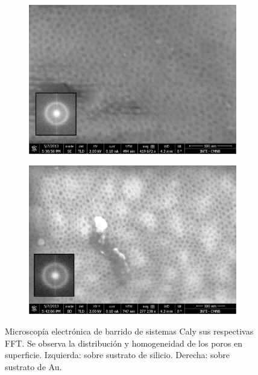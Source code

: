 			\begin{figure}[th]
		 	   	    \begin{subfigure}[t]{0.49\textwidth}
			        	\includegraphics[width=\textwidth]{Imagenes/F127_Si_sup.jpg}
			       		\end{subfigure}
					\begin{subfigure}[t]{0.49\textwidth}
			 	   	    \includegraphics[width=\textwidth]{Imagenes/F127_Au_sup.jpg}
			       		\end{subfigure}
					\caption[MEB arreglo poroso para \pdmF\space sobre Si y Au.]{Microscopía electrónica de barrido de sistemas Cal\pdmF\space y sus respectivas FFT. Se observa la distribución y homogeneidad de los poros en superficie. Izquierda: sobre sustrato de silicio. Derecha: sobre sustrato de Au.}	 
					 \label{fig:F127_Si_Au}
					 \end{figure}

